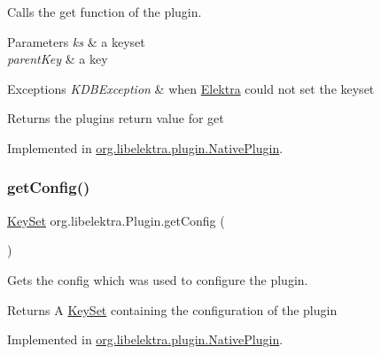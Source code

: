Calls the get function of the plugin. 


\begin{DoxyParams}{Parameters}
{\em ks} & a keyset \\
\hline
{\em parent\+Key} & a key \\
\hline
\end{DoxyParams}

\begin{DoxyExceptions}{Exceptions}
{\em K\+D\+B\+Exception} & when \hyperlink{interfaceorg_1_1libelektra_1_1Elektra}{Elektra} could not set the keyset \\
\hline
\end{DoxyExceptions}
\begin{DoxyReturn}{Returns}
the plugin\textquotesingle{}s return value for get 
\end{DoxyReturn}


Implemented in \hyperlink{classorg_1_1libelektra_1_1plugin_1_1NativePlugin_a766870e5f26cab4d497ed7c2fbc4abd9}{org.\+libelektra.\+plugin.\+Native\+Plugin}.

\mbox{\label{interfaceorg_1_1libelektra_1_1Plugin_a95ee37a782d5bd32fd95478788652d44}} 
\subsubsection{\texorpdfstring{get\+Config()}{getConfig()}}
{\footnotesize\ttfamily \hyperlink{classorg_1_1libelektra_1_1KeySet}{Key\+Set} org.\+libelektra.\+Plugin.\+get\+Config (\begin{DoxyParamCaption}{ }\end{DoxyParamCaption})}



Gets the config which was used to configure the plugin. 

\begin{DoxyReturn}{Returns}
A \hyperlink{classorg_1_1libelektra_1_1KeySet}{Key\+Set} containing the configuration of the plugin 
\end{DoxyReturn}


Implemented in \hyperlink{classorg_1_1libelektra_1_1plugin_1_1NativePlugin_af9c78565029ed2ae38241759549e4b5a}{org.\+libelektra.\+plugin.\+Native\+Plugin}.

\mbox{\label{interfaceorg_1_1libelektra_1_1Plugin_a51be1d6efdd3542c2ae503031bd16e04}} 
